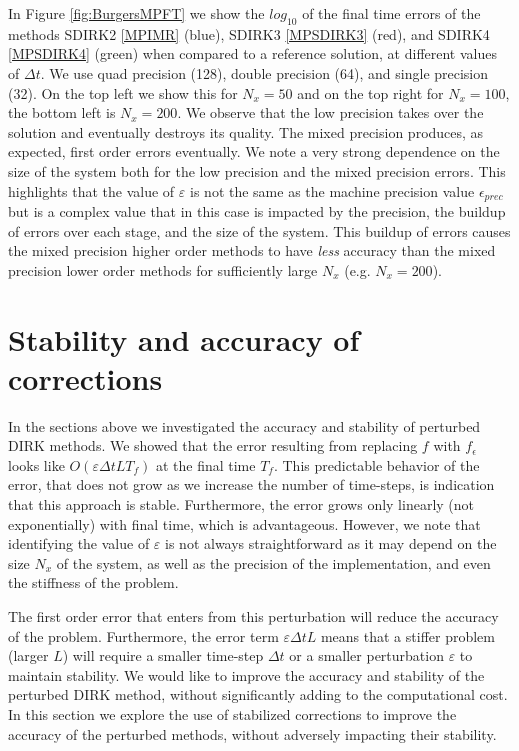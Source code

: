 \documentclass{siamart251104}
\newcommand{\dt}{\Delta t}
\begin{document}
In Figure \ref{fig:BurgersMPFT} we show the 
$log_{10}$ of the final time errors of the methods SDIRK2
\eqref{MPIMR} (blue), SDIRK3 \eqref{MPSDIRK3} (red), and
SDIRK4 \eqref{MPSDIRK4} (green) when compared to 
a reference solution, at different values of $\dt$.
We use quad precision (128), double precision (64),
and single precision (32). On the top left we show this for 
$N_x=50$ and on the top right for $N_x=100$, the bottom left is 
$N_x=200$.
We observe that the low precision takes over the solution and eventually 
destroys its quality. The mixed precision produces, as expected, first order
errors eventually. We note a  very strong dependence on the size of the system
both for the low precision and the mixed precision errors.
This highlights that the value of $\varepsilon$ is not the same as the machine precision value 
$\epsilon_{prec}$ but is a complex value that in this case is impacted by the precision,
the buildup of errors over each stage, and the size of the system.
This buildup of errors causes the mixed precision higher order methods to have {\em less}
accuracy than the mixed precision lower order methods for sufficiently large $N_x$ (e.g. 
$N_x = 200$).



\section{Stability and accuracy of corrections}
\label{sec:corr}

In the sections above we investigated the accuracy  and stability  of perturbed DIRK methods. 
We showed that the error resulting from replacing $f$ with $f_\epsilon$  
looks like $O(\varepsilon \dt  L T_f)$  at the final time $T_f$. 
This predictable behavior of the error, that does not grow as we increase the number of time-steps, is indication that this approach is stable.  Furthermore, the error grows only
linearly (not exponentially) with final time, which is advantageous. 
However, we note that identifying the  value of $\varepsilon$ 
is not always straightforward as it may depend on the size $N_x$ of the system,
as well as the precision of the implementation, and even the stiffness of the problem.


The first order error that enters from this perturbation will reduce the accuracy of the problem.
Furthermore, the error term $\varepsilon \dt  L$  means that a stiffer problem  (larger $L$)  
will  require a smaller time-step $\dt$ or a smaller perturbation $\varepsilon$ 
to maintain  stability.    We would like to  improve the accuracy and stability  
of the  perturbed DIRK method, without significantly adding to the computational cost.
In  this section we explore the use of  stabilized corrections to  improve the accuracy  of the  perturbed methods, without adversely impacting their stability.
 
\end{document}
